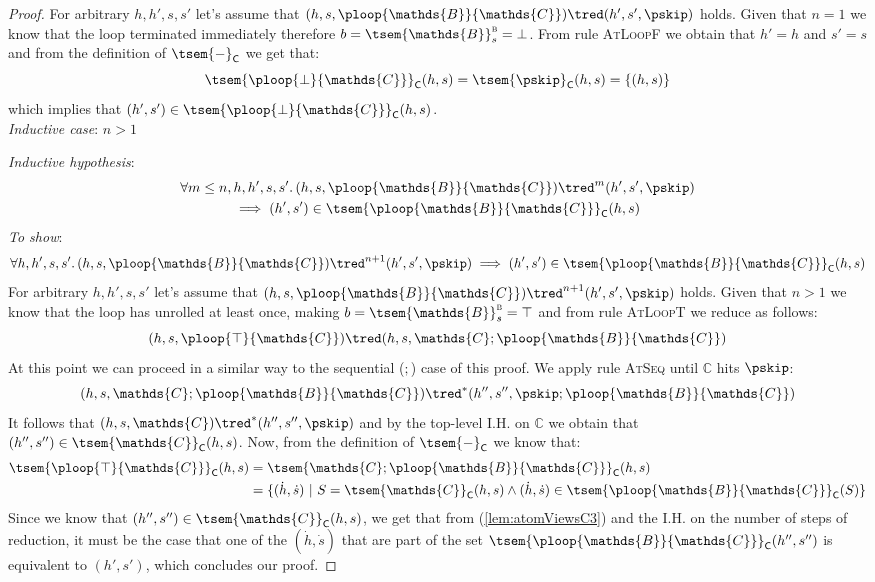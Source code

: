 \begin{lem}
{\begin{proof}
	For arbitrary $h, h', s, s'$ let's assume that $(h, s, \ploop{\mathds{B}}{\mathds{C}}) \tred (h', s', \pskip)$ holds. Given that $n=1$ we know that the loop terminated immediately therefore $b = \tsem{\mathds{B}}^\textsc{b}_s = \bot$.  From rule \textsc{AtLoopF} we obtain that $h' = h$ and $s' = s$ and from the definition of $\tsem{-}_\mathsf{C}$ we get that:
	\[
		\tsem{\ploop{\bot}{\mathds{C}}}_\mathsf{C}(h, s) = \tsem{\pskip}_\mathsf{C}(h,s) = \{(h, s)\}
	\]
	which implies that $(h', s') \in \tsem{\ploop{\bot}{\mathds{C}}}_\mathsf{C}(h, s)$. \\
	
	\textit{Inductive case}: $n > 1$
	
	\textit{Inductive hypothesis}:
	\begin{gather*}
		\forall m \leq n, h, h', s, s' \ldotp
		(h, s, \ploop{\mathds{B}}{\mathds{C}}) \tred^m (h', s', \pskip) \\
		\implies
		(h', s') \in \tsem{\ploop{\mathds{B}}{\mathds{C}}}_\mathsf{C}(h, s)
	\end{gather*}
	\textit{To show}:
	\[
		\forall h, h', s, s' \ldotp
		(h, s, \ploop{\mathds{B}}{\mathds{C}}) \tred^{n+1} (h', s', \pskip)
		\implies
		(h', s') \in \tsem{\ploop{\mathds{B}}{\mathds{C}}}_\mathsf{C}(h, s)
	\]
	For arbitrary $h, h', s, s'$ let's assume that $(h, s, \ploop{\mathds{B}}{\mathds{C}}) \tred^{n+1} (h', s', \pskip)$ holds. Given that $n>1$ we know that the loop has unrolled at least once, making $b = \tsem{\mathds{B}}^\textsc{b}_s = \top$ and from rule \textsc{AtLoopT} we reduce as follows:
	\[
		(h, s, \ploop{\top}{\mathds{C}}) \tred (h, s, \mathds{C} ; \ploop{\mathds{B}}{\mathds{C}})
	\]
	At this point we can proceed in a similar way to the sequential ($;$) case of this proof. We apply rule \textsc{AtSeq} until $\mathds{C}$ hits $\pskip$:
	\[
		(h, s, \mathds{C} ; \ploop{\mathds{B}}{\mathds{C}})
			\tred^*
		(h'', s'', \pskip ; \ploop{\mathds{B}}{\mathds{C}})
	\]
	It follows that $(h, s, \mathds{C}) \tred^* (h'', s'', \pskip)$ and by the top-level I.H. on $\mathds{C}$ we obtain that $(h'', s'') \in \tsem{\mathds{C}}_\mathsf{C}(h, s)$. Now, from the definition of $\tsem{-}_\mathsf{C}$ we know that:
	\begin{align}
		\tsem{\ploop{\top}{\mathds{C}}}_\mathsf{C}(h, s)
		&= \tsem{\mathds{C} ; \ploop{\mathds{B}}{\mathds{C}}}_\mathsf{C}(h,s) \\
		\label{lem:atomViewsC4}
		&= \{ (\dot{h}, \dot{s})\ |\ S = \tsem{\mathds{C}}_\mathsf{C}(h,s) \land (\dot{h}, \dot{s}) \in  \tsem{\ploop{\mathds{B}}{\mathds{C}}}_\mathsf{C}(S)\}
	\end{align}
	Since we know that $(h'', s'') \in \tsem{\mathds{C}}_\mathsf{C}(h, s)$, we get that from (\ref{lem:atomViewsC3}) and the I.H. on the number of steps of reduction, it must be the case that one of the $(\dot{h}, \dot{s})$ that are part of the set $\tsem{\ploop{\mathds{B}}{\mathds{C}}}_\mathsf{C}(h'', s'')$ is equivalent to $(h', s')$, which concludes our proof.
	\end{proof}
	}
\end{lem}

